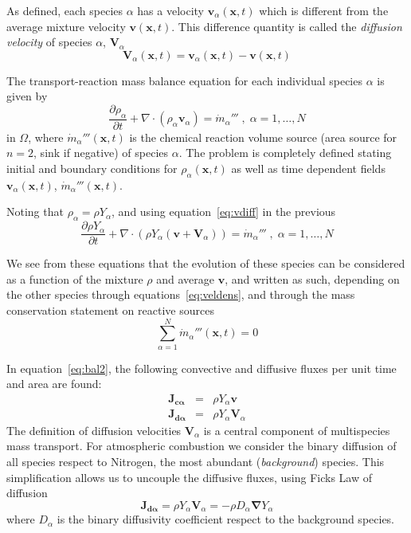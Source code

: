As defined, each species $\alpha$ has a velocity $\mathbf{v}_\alpha(\mathbf{x},t)$ which is different from the average mixture velocity $\mathbf{v}(\mathbf{x},t)$. This difference quantity is called the \textit{diffusion velocity} of species $\alpha$, $\mathbf{V}_\alpha$
%
\begin{equation}
   \mathbf{V}_\alpha(\mathbf{x},t) = \mathbf{v}_\alpha(\mathbf{x},t) - \mathbf{v}(\mathbf{x},t) \label{eq:vdiff}
\end{equation}
%

The transport-reaction mass balance equation for each individual species $\alpha$ is given by
%
\begin{equation}
   \frac{\partial \rho_\alpha}{ \partial t} + \nabla \cdot (\rho_\alpha  \mathbf{v}_\alpha) = \dot{m}_\alpha''' \; , \; \alpha=1,\dots,N \label{eq:bal}
\end{equation}
%
in $\Omega$, where $\dot{m}_\alpha'''(\mathbf{x},t)$ is the chemical reaction volume source (area source for $n=2$, sink if negative) of species $\alpha$. The problem is completely defined stating initial and boundary conditions for $\rho_\alpha(\mathbf{x},t)$ as well as time dependent fields $\mathbf{v}_\alpha(\mathbf{x},t)$, $\dot{m}_\alpha'''(\mathbf{x},t)$.

Noting that $ \rho_\alpha = \rho Y_\alpha$, and using equation~\eqref{eq:vdiff} in the previous
%
\begin{equation}
   \frac{\partial \rho Y_\alpha}{ \partial t} + \nabla \cdot \left( \rho Y_\alpha  (\mathbf{v}+\mathbf{V}_\alpha) \right) = \dot{m}_\alpha''' \; , \; \alpha=1,\dots,N \label{eq:bal2}
\end{equation}
%

We see from these equations that the evolution of these species can be considered as a function of the mixture $\rho$ and average $\mathbf{v}$, and written as such, depending on the other species through equations~\eqref{eq:veldens}, and through the mass conservation statement on reactive sources
%
\begin{equation}
  \sum\limits_{\alpha=1}^{N} \dot{m}_\alpha'''(\mathbf{x},t) = 0
\end{equation}
%

In equation~\eqref{eq:bal2}, the following convective and diffusive fluxes per unit time and area are found:
%
\begin{eqnarray}
  \mathbf{J_{c \alpha}} &=& \rho Y_\alpha  \mathbf{v} \label{eq:jc} \\
  \mathbf{J_{d \alpha}} &=& \rho Y_\alpha  \mathbf{V}_\alpha \label{eq:jd}
\end{eqnarray}
%
The definition of diffusion velocities $\mathbf{V}_\alpha$ is a central component of multispecies mass transport. For atmospheric combustion we consider the binary diffusion of all species respect to Nitrogen, the most abundant (\textit{background}) species. This simplification allows us to uncouple the diffusive fluxes, using Ficks Law of diffusion
%
\begin{equation}
   \mathbf{J_{d \alpha}} = \rho Y_\alpha  \mathbf{V}_\alpha = - \rho D_\alpha \boldsymbol{\nabla} Y_\alpha \label{eq:fick}
\end{equation}
%
where $D_\alpha$ is the binary diffusivity coefficient respect to the background species.

